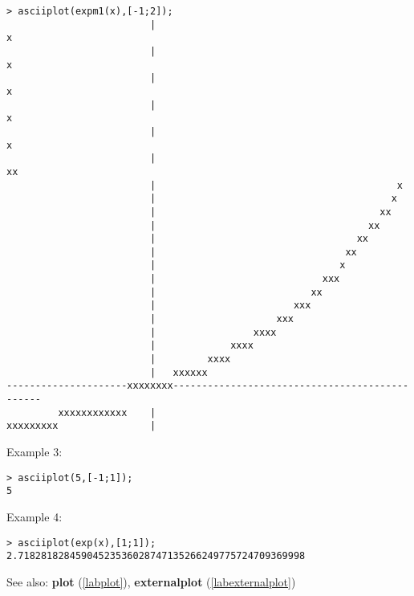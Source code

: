 \begin{center}\begin{minipage}{15cm}\begin{Verbatim}[frame=single]
> asciiplot(expm1(x),[-1;2]);
                         |                                                 x
                         |                                                x 
                         |                                               x  
                         |                                              x   
                         |                                             x    
                         |                                           xx     
                         |                                          x       
                         |                                         x        
                         |                                       xx         
                         |                                     xx           
                         |                                   xx             
                         |                                 xx               
                         |                                x                 
                         |                             xxx                  
                         |                           xx                     
                         |                        xxx                       
                         |                     xxx                          
                         |                 xxxx                             
                         |             xxxx                                 
                         |         xxxx                                     
                         |   xxxxxx                                         
---------------------xxxxxxxx-----------------------------------------------
         xxxxxxxxxxxx    |                                                  
xxxxxxxxx                |                                                  
\end{Verbatim}
\end{minipage}\end{center}
\noindent Example 3: 
\begin{center}\begin{minipage}{15cm}\begin{Verbatim}[frame=single]
> asciiplot(5,[-1;1]);
5
\end{Verbatim}
\end{minipage}\end{center}
\noindent Example 4: 
\begin{center}\begin{minipage}{15cm}\begin{Verbatim}[frame=single]
> asciiplot(exp(x),[1;1]);
2.71828182845904523536028747135266249775724709369998
\end{Verbatim}
\end{minipage}\end{center}
See also: \textbf{plot} (\ref{labplot}), \textbf{externalplot} (\ref{labexternalplot})
